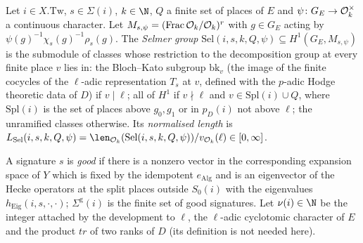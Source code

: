 \begin{definition}\label{pf:baselat1:def:selmer}
Let $i\in X.\mathrm{Tw}$, $s\in\Sigma(i)$, $k\in\N$, $Q$ a finite set of places of $E$ and
$\psi\colon G_E\to\mathcal O_k^\times$ a continuous character. Let $M_{s,\psi}=(\operatorname{Frac}
\mathcal O_k/\mathcal O_k)^r$ with $g\in G_E$ acting by $\psi(g)^{-1}\chi_s(g)^{-1}\rho_s(g)$. The
\emph{Selmer group} $\mathrm{Sel}(i,s,k,Q,\psi)\subseteq H^1(G_E,M_{s,\psi})$ is the submodule of classes whose
restriction to the decomposition group at every finite place $v$ lies in: the Bloch--Kato subgroup
$\mathrm{bk}_v$ (the image of the finite cocycles of the $\ell$-adic representation $T_s$ at $v$, defined with the
$p$-adic Hodge theoretic data of $D$) if $v\mid\ell$; all of $H^1$ if $v\nmid\ell$ and $v\in\mathrm{Spl}(i)\cup Q$,
where $\mathrm{Spl}(i)$ is the set of places above $g_0,g_1$ or in $p_D(i)$ not above $\ell$; the unramified
classes otherwise. Its \emph{normalised length} is
$L_{\mathrm{Sel}}(i,s,k,Q,\psi)=\len_{\baselatoneO_k}(\mathrm{Sel}(i,s,k,Q,\psi))/v_{\baselatoneO_k}(\ell)
\in[0,\infty]$.
\end{definition}

A signature $s$ is \emph{good} if there is a nonzero vector in the corresponding expansion space of $Y$ which is
fixed by the idempotent $e_{\mathrm{Alg}}$ and is an eigenvector of the Hecke operators at the split places
outside $S_0(i)$ with the eigenvalues $h_{\mathrm{Eig}}(i,s,\cdot,\cdot)$; $\Sigma^{\mathrm g}(i)$ is the finite set
of good signatures. Let $\nu(i)\in\N$ be the integer attached by the development to
$\ell$, the $\ell$-adic cyclotomic character of $E$ and the product $tr$ of two ranks of $D$ (its definition is
not needed here).

